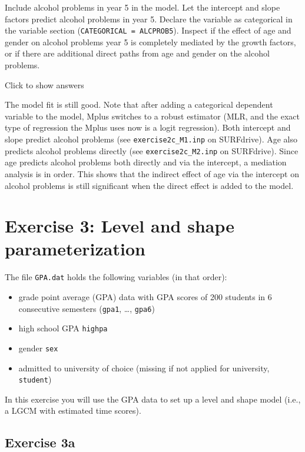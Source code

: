 \documentclass[
]{book}
\providecommand{\tightlist}{%
  \setlength{\itemsep}{0pt}\setlength{\parskip}{0pt}}
\begin{document}
Include alcohol problems in year 5 in the model. Let the intercept and slope factors predict alcohol problems in year 5. Declare the variable as categorical in the variable section (\texttt{CATEGORICAL\ =\ ALCPROB5}). Inspect if the effect of age and gender on alcohol problems year 5 is completely mediated by the growth factors, or if there are additional direct paths from age and gender on the alcohol problems.

Click to show answers

The model fit is still good. Note that after adding a categorical dependent variable to the model, Mplus switches to a robust estimator (MLR, and the exact type of regression the Mplus uses now is a logit regression). Both intercept and slope predict alcohol problems (see \texttt{exercise2c\_M1.inp} on SURFdrive). Age also predicts alcohol problems directly (see \texttt{exercise2c\_M2.inp} on SURFdrive). Since age predicts alcohol problems both directly and via the intercept, a mediation analysis is in order. This shows that the indirect effect of age via the intercept on alcohol problems is still significant when the direct effect is added to the model.

\hypertarget{exercise-3-level-and-shape-parameterization}{%
\section{Exercise 3: Level and shape parameterization}\label{exercise-3-level-and-shape-parameterization}}

The file \texttt{GPA.dat} holds the following variables (in that order):

\begin{itemize}
\tightlist
\item
  grade point average (GPA) data with GPA scores of 200 students in 6 consecutive semesters (\texttt{gpa1}, \ldots, \texttt{gpa6})
\item
  high school GPA \texttt{highpa}
\item
  gender \texttt{sex}
\item
  admitted to university of choice (missing if not applied for university, \texttt{student})
\end{itemize}

In this exercise you will use the GPA data to set up a level and shape model (i.e., a LGCM with estimated time scores).

\hypertarget{exercise-3a}{%
\subsection{Exercise 3a}\label{exercise-3a}}
\end{document}
